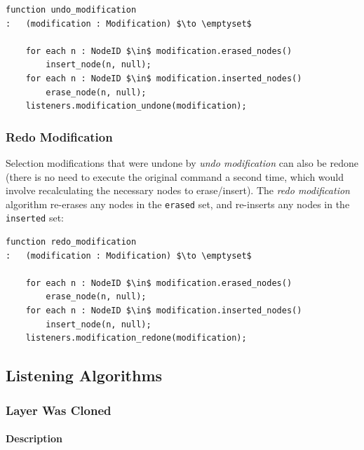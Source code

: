 \begin{lstlisting}[style=Default]
function undo_modification
:	(modification : Modification) $\to \emptyset$

	for each n : NodeID $\in$ modification.erased_nodes()
		insert_node(n, null);
	for each n : NodeID $\in$ modification.inserted_nodes()
		erase_node(n, null);
	listeners.modification_undone(modification);
\end{lstlisting}

\subsubsection{Redo Modification}

Selection modifications that were undone by \emph{undo modification} can also be redone (there is no need to execute the original command a second time, which would involve recalculating the necessary nodes to erase/insert). The \emph{redo modification} algorithm re-erases any nodes in the \texttt{erased} set, and re-inserts any nodes in the \texttt{inserted} set:

\begin{lstlisting}[style=Default]
function redo_modification
:	(modification : Modification) $\to \emptyset$

	for each n : NodeID $\in$ modification.erased_nodes()
		erase_node(n, null);
	for each n : NodeID $\in$ modification.inserted_nodes()
		insert_node(n, null);
	listeners.modification_redone(modification);
\end{lstlisting}

\newpage

\subsection{Listening Algorithms}

\subsubsection{Layer Was Cloned}

\paragraph{Description}

